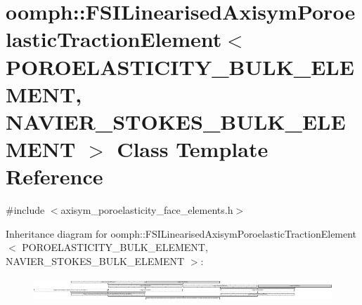 \hypertarget{classoomph_1_1FSILinearisedAxisymPoroelasticTractionElement}{}\section{oomph\+:\+:F\+S\+I\+Linearised\+Axisym\+Poroelastic\+Traction\+Element$<$ P\+O\+R\+O\+E\+L\+A\+S\+T\+I\+C\+I\+T\+Y\+\_\+\+B\+U\+L\+K\+\_\+\+E\+L\+E\+M\+E\+NT, N\+A\+V\+I\+E\+R\+\_\+\+S\+T\+O\+K\+E\+S\+\_\+\+B\+U\+L\+K\+\_\+\+E\+L\+E\+M\+E\+NT $>$ Class Template Reference}
\label{classoomph_1_1FSILinearisedAxisymPoroelasticTractionElement}


{\ttfamily \#include $<$axisym\+\_\+poroelasticity\+\_\+face\+\_\+elements.\+h$>$}

Inheritance diagram for oomph\+:\+:F\+S\+I\+Linearised\+Axisym\+Poroelastic\+Traction\+Element$<$ P\+O\+R\+O\+E\+L\+A\+S\+T\+I\+C\+I\+T\+Y\+\_\+\+B\+U\+L\+K\+\_\+\+E\+L\+E\+M\+E\+NT, N\+A\+V\+I\+E\+R\+\_\+\+S\+T\+O\+K\+E\+S\+\_\+\+B\+U\+L\+K\+\_\+\+E\+L\+E\+M\+E\+NT $>$\+:\begin{figure}[H]
\begin{center}
\leavevmode
\includegraphics[height=0.896287cm]{classoomph_1_1FSILinearisedAxisymPoroelasticTractionElement}
\end{center}
\end{figure}

